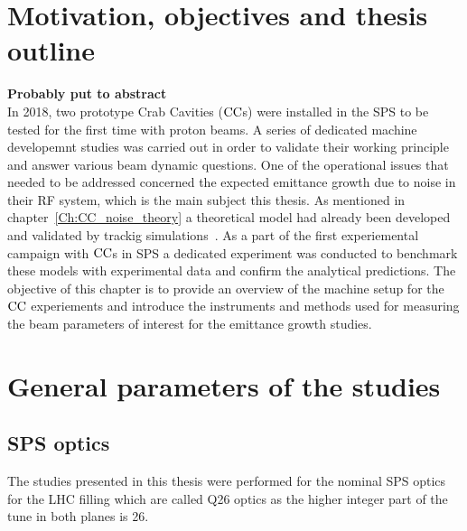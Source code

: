 \section{Motivation, objectives and thesis outline}

\textbf{Probably put to abstract}\\
In 2018, two prototype Crab Cavities (${\mathrm{CC}}$s) were installed in the SPS to be tested for the first time with proton beams. A series of dedicated machine developemnt studies was carried out in order to validate their working principle and answer various beam dynamic questions. One of the operational issues that needed to be addressed concerned the expected emittance growth due to noise in their RF system, which is the main subject this thesis.  As mentioned in chapter~\ref{Ch:CC_noise_theory} a theoretical model had already been developed and validated by trackig simulations~\cite{PhysRevSTAB.18.101001}. 
As a part of the first experiemental campaign with ${\mathrm{CC}}$s in SPS a dedicated experiment was conducted to benchmark these models with experimental data and confirm the analytical predictions. The objective of this chapter is to provide an overview of the machine setup for the ${\mathrm{CC}}$ experiements and introduce the instruments and methods used for measuring the beam parameters of interest for the emittance growth studies.

\section{General parameters of the studies}
\subsection{SPS optics}\label{subsec:SPS_optics_model}
 The studies presented in this thesis were performed for the nominal SPS optics for the LHC filling which are called Q26 optics as the higher integer part of the tune in both planes is 26. 

